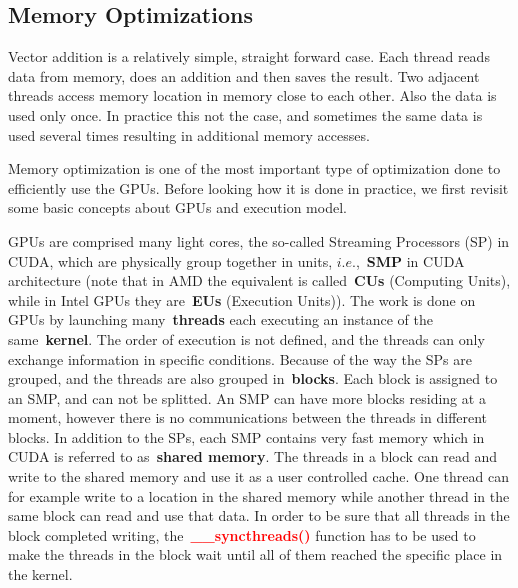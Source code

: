 

\subsection{Memory Optimizations}\label{sec:memory_optimization}


\par
Vector addition is a relatively simple, straight forward case.
Each thread reads data from memory, does an addition and then saves the result. 
Two adjacent threads access memory location in memory close to each other.
Also the data is used only once.
In practice this not the case, and sometimes the same data is used several times resulting in additional memory accesses.


\par
Memory optimization is one of the most important type of optimization done to efficiently use the GPUs.
Before looking how it is done in practice, we first revisit some basic concepts about GPUs and execution model.


\par
GPUs are comprised many light cores, the so-called Streaming Processors (SP) in CUDA, which are physically group together in units, $i.e.$,~\textbf{SMP} in CUDA architecture (note that in AMD the equivalent is called~\textbf{CUs} (Computing Units), while in Intel GPUs they are~\textbf{EUs} (Execution Units)).
The work is done on GPUs by launching many~\textbf{threads} each executing an instance of the same~\textbf{kernel}.
The order of execution is not defined, and the threads can only exchange information in specific conditions.
Because of the way the SPs are grouped, and the threads are also grouped in~\textbf{blocks}.
Each block is assigned to an SMP, and can not be splitted.
An SMP can have more blocks residing at a moment, however there is no communications between the threads in different blocks.
In addition to the SPs, each SMP contains very fast memory which in CUDA is referred to as~\textbf{shared memory}.
The threads in a block can read and write to the shared memory and use it as a user controlled cache.
One thread can for example write to a location in the shared memory while another thread in the same block can read and use that data.
In order to be sure that all threads in the block completed writing, the~\textbf{\textcolor{red}{\_\_syncthreads()}} function has to be used to make the threads in the block wait until all of them reached the specific place in the kernel.


